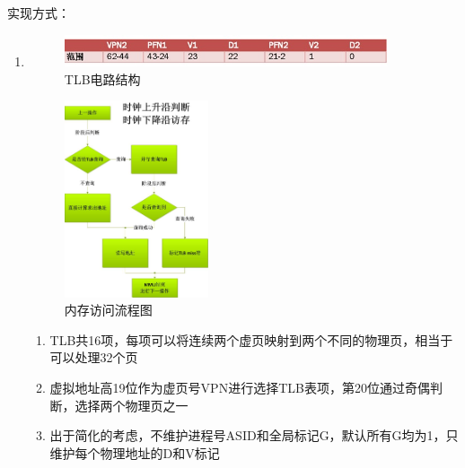             实现方式：
            \begin{enumerate}
            \item
                \begin{figure}[!hbp]
                    \centering
                    \caption{TLB电路结构}
                    \includegraphics[width=0.9\textwidth]{chart/TLB.jpg}
                \end{figure}

                \begin{figure}[!hbp]
                    \centering
                    \caption{内存访问流程图}
                    \includegraphics[width=0.4\textwidth]{chart/Memory.jpg}
                \end{figure}
                
                \begin{enumerate}
                \item
                    TLB共16项，每项可以将连续两个虚页映射到两个不同的物理页，相当于可以处理32个页
                \item
                    虚拟地址高19位作为虚页号VPN进行选择TLB表项，第20位通过奇偶判断，选择两个物理页之一
                \item
                    出于简化的考虑，不维护进程号ASID和全局标记G，默认所有G均为1，只维护每个物理地址的D和V标记
                \end{enumerate}


\end{enumerate}
